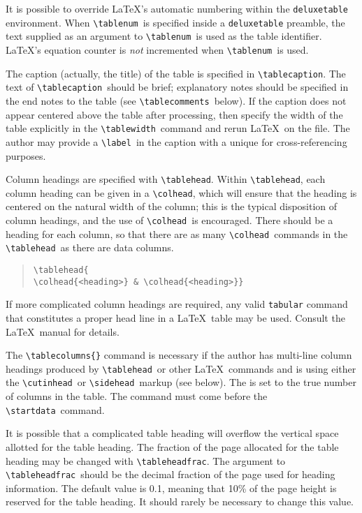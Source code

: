 \documentclass[preprint2]{aastex}
\begin{document}
It is possible to override \LaTeX's automatic numbering within the 
\texttt{deluxetable} environment. 
When \verb"\tablenum"\ 
 is specified inside a \texttt{deluxetable} 
preamble, 
the text supplied as an argument to \verb"\tablenum"\ 
 is used as the 
table identifier. 
\LaTeX's equation counter is \emph{not} incremented when 
\verb"\tablenum"\ 
 is used. 
 
The caption (actually, the title) of the table is specified 
in \verb"\tablecaption". 
The text of \verb"\tablecaption"\ 
 should be brief; 
explanatory notes should be specified in the end notes to the table 
(see \verb"\tablecomments"\ 
 below).  If the caption 
does not appear 
centered above the table after processing, then specify the width of 
the table explicitly in the \verb"\tablewidth"\ 
 command and rerun 
\LaTeX\ on the file.   The author 
may provide a \verb"\label"\ in the caption with a unique  
for cross-referencing 
purposes. 
 
  Column headings are specified with \verb"\tablehead". 
Within \verb"\tablehead", each column heading can be given 
in a \verb"\colhead", which will ensure that the heading 
is centered 
on the natural width of the column; this is the typical disposition 
of column headings, and the use of \verb"\colhead"\ 
 is encouraged. 
There should be a heading for each column, so that there are as 
many \verb"\colhead"\ 
 commands in the \verb"\tablehead"\ 
 as there 
are data columns. 
 
\begin{quote} 
\begin{verbatim} 
\tablehead{ 
\colhead{<heading>} & \colhead{<heading>}} 
\end{verbatim} 
\end{quote} 
 
If more complicated column headings are required, 
any valid \texttt{tabular} command that constitutes a proper 
head line in a \LaTeX\ table may be used. 
Consult the \LaTeX\ manual \citep{Lamport} for details. 
 
The \verb"\tablecolumns{"\verb"}" command 
is necessary if the author has 
multi-line column headings produced by \verb"\tablehead"\ 
 or other \LaTeX\ 
commands and is using either the \verb"\cutinhead"\ 
 or \verb"\sidehead"\ 
markup (see below).  The \m{num} is 
set to the true number of columns in the 
table.  The command must come before the \verb"\startdata"\ 
 command. 
 
It is possible that a complicated table heading will overflow 
the vertical space allotted for the table heading. 
The fraction of the page allocated 
for the table heading may be changed with \verb"\tableheadfrac". 
The \m{num} argument to \verb"\tableheadfrac"\ 
 should be the 
decimal fraction of the page used for heading information. 
The default value is 0.1, meaning that 10\% of the page height 
is reserved for the table heading.  It should rarely be necessary 
to change this value. 
 
\end{document}

